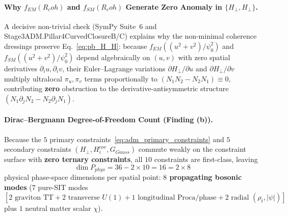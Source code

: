 \documentclass[american,11pt,letterpaper]{article}
\newcommand{\Rcoh}{R_{\mathrm{coh}}}
\def\mathcal#1{#1}%
\def\mathrm#1{#1}%
\def\texttt#1{#1}%
\def\emph#1{#1}%
\def\Rcoh{R_coh}%
\begin{document}
\paragraph{Why $f_{\mathrm{EM}}(\Rcoh)$ and $f_{\mathrm{SM}}(\Rcoh)$ Generate Zero Anomaly in $\{\mathcal{H}_\perp, \mathcal{H}_\perp\}$.}
A decisive non-trivial check (SymPy Suite~6 and \texttt{Stage3\allowbreak{}ADM.\allowbreak{}Pillar4\allowbreak{}Curved\allowbreak{}Closure\allowbreak{}B/C}) explains why the non-minimal coherence dressings preserve Eq.~\eqref{eq:pb_H_H}: because $f_{\mathrm{EM}}((u^2+v^2)/\psi_0^2)$ and $f_{\mathrm{SM}}((u^2+v^2)/\psi_0^2)$ depend algebraically on $(u,v)$ with \emph{zero spatial derivatives} $\partial_i u, \partial_i v$, their Euler--Lagrange variations $\partial\mathcal{H}_\perp/\partial u$ and $\partial\mathcal{H}_\perp/\partial v$ multiply ultralocal $\pi_u, \pi_v$ terms proportionally to $(N_1 N_2 - N_2 N_1) \equiv 0$, contributing \textbf{zero} obstruction to the derivative-antisymmetric structure $(N_1\partial_j N_2 - N_2\partial_j N_1)$.

\paragraph{Dirac--Bergmann Degree-of-Freedom Count (\texttt{Finding (b)}).}
Because the $5$ primary constraints~\eqref{eq:adm_primary_constraints} and $5$ secondary constraints $(\mathcal{H}_\perp, \mathcal{H}_i^{\mathrm{cov}}, G_{\mathrm{Gauss}})$ commute weakly on the constraint surface with \textbf{zero ternary constraints}, all $10$ constraints are first-class, leaving
\begin{equation}
\dim\mathcal{P}_{\mathrm{phys}} = 36 - 2 \times 10 = 16 = 2 \times 8
\label{eq:dirac_bergmann_16_dims}
\end{equation}
physical phase-space dimensions per spatial point: \textbf{$8$ propagating bosonic modes} ($7$ pure-SIT modes $[2\text{ graviton TT} + 2\text{ transverse }U(1) + 1\text{ longitudinal Proca/phase} + 2\text{ radial }(\rho_t,|\psi|)]$ plus $1$ neutral matter scalar $\chi$).
\end{document}
